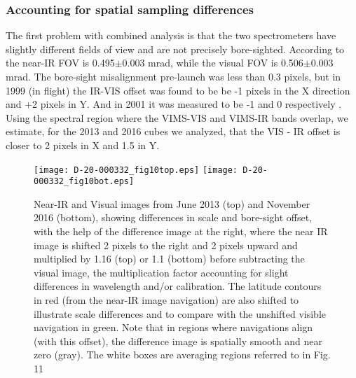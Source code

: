 \documentclass[article,11pt]{emulateapj}
\begin{document}
\subsubsection{Accounting for spatial sampling differences}
 The first problem
with combined analysis is that the two spectrometers have slightly
different fields of view and are not precisely bore-sighted. According
to \cite{Brown2004} the near-IR FOV is 0.495$\pm$0.003 mrad, while
the visual FOV is 0.506$\pm$0.003 mrad. The bore-sight misalignment
pre-launch was less than 0.3 pixels, but in 1999 (in flight) the IR-VIS offset was found to be
be -1 pixels in the X direction and +2 pixels in Y. And in 2001 it was
measured to be -1 and 0 respectively \citep{Brown2004}.  Using the spectral region
where the VIMS-VIS and VIMS-IR bands overlap, we estimate, for the 2013 and 2016 cubes
we analyzed, that the VIS - IR offset
is closer to 2 pixels in X and 1.5 in Y. 

\begin{figure*}[!htb]\centering
\texttt{[image: D-20-000332\_fig10top.eps]}
\texttt{[image: D-20-000332\_fig10bot.eps]}
\caption{Near-IR and Visual images from June 2013 (top) and November 2016 (bottom), showing differences
  in scale and bore-sight offset, with the help of the difference image
  at the right, where the near IR image is shifted 2 pixels to the
  right and 2 pixels upward and multiplied by 1.16 (top) or 1.1 (bottom) before subtracting
  the visual image, the multiplication factor accounting for slight
  differences in wavelength and/or calibration. The latitude contours in red
  (from the near-IR image navigation) are also shifted to illustrate scale
  differences and to compare with the unshifted visible navigation in green.  Note that in regions where
  navigations align (with this offset), the difference image is spatially
smooth and near zero (gray).  The white boxes are averaging regions referred to
in Fig. 11}
\label{Fig:visnirdiff}
\end{figure*} 
\end{document}
